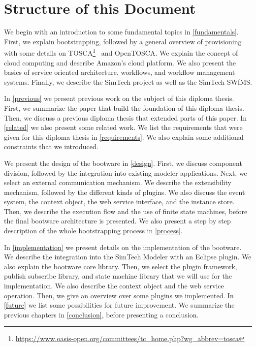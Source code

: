 \section{Structure of this Document}

We begin with an introduction to some fundamental topics in \autoref{fundamentals}.
First, we explain bootstrapping, followed by a general overview of provisioning with some details on TOSCA\footnote{\url{https://www.oasis-open.org/committees/tc_home.php?wg_abbrev=tosca}}~\autocite{tosca:spec} and OpenTOSCA.
We explain the concept of cloud computing and describe Amazon's cloud platform.
We also present the basics of service oriented architecture, workflows, and workflow management systems.
Finally, we describe the SimTech project as well as the SimTech SWfMS.

In \autoref{previous} we present previous work on the subject of this diploma thesis.
First, we summarize the paper that build the foundation of this diploma thesis.
Then, we discuss a previous diploma thesis that extended parts of this paper.
In \autoref{related} we also present some related work.
We list the requirements that were given for this diploma thesis in \autoref{requirements}.
We also explain some additional constraints that we introduced.

We present the design of the bootware in \autoref{design}.
First, we discuss component division, followed by the integration into existing modeler applications.
Next, we select an external communication mechanism.
We describe the extensibility mechanism, followed by the different kinds of plugins.
We also discuss the event system, the context object, the web service interface, and the instance store.
Then, we describe the execution flow and the use of finite state machines, before the final bootware architecture is presented.
We also present a step by step description of the whole bootstrapping process in \autoref{process}.

In \autoref{implementation} we present details on the implementation of the bootware.
We describe the integration into the SimTech Modeler with an Eclipse plugin.
We also explain the bootware core library.
Then, we select the plugin framework, publish subscribe library, and state machine library that we will use for the implementation.
We also describe the context object and the web service operation.
Then, we give an overview over some plugins we implemented.
In \autoref{future} we list some possibilities for future improvement.
We summarize the previous chapters in \autoref{conclusion}, before presenting a conclusion.
